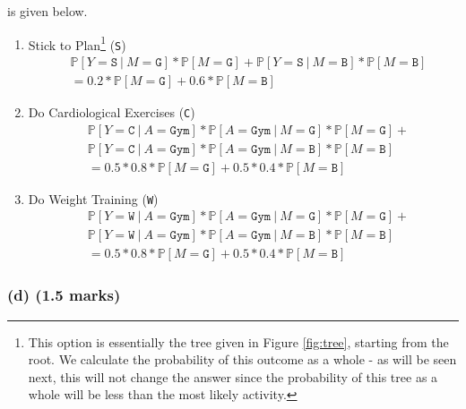 \documentclass[12pt]{article}
\begin{document}
    is given below.
    \begin{enumerate}
        \item Stick to Plan\footnote{
            This option is essentially the tree given in Figure \ref{fig:tree}, starting
            from the root. We calculate the probability of this outcome as a whole - as will
            be seen next, this will not change the answer since the probability of this tree
            as a whole will be less than the most likely activity.
        } (\texttt{S}) \begin{align*}
            &\mathbb{P}[Y = \texttt{S} \ | \ M = \texttt{G}] * \mathbb{P}[M = \texttt{G}] + \mathbb{P}[Y = \texttt{S} \ | \ M = \texttt{B}] * \mathbb{P}[M = \texttt{B}] \\
            &= 0.2 * \mathbb{P}[M = \texttt{G}] + 0.6 * \mathbb{P}[M = \texttt{B}]
        \end{align*}

        \item Do Cardiological Exercises (\texttt{C}) \begin{align*}
            &\mathbb{P}[Y = \texttt{C} \ | \ A = \texttt{Gym}] * \mathbb{P}[A = \texttt{Gym} \ | \ M = \texttt{G}] * \mathbb{P}[M = \texttt{G}] + \\
            &\mathbb{P}[Y = \texttt{C} \ | \ A = \texttt{Gym}] * \mathbb{P}[A = \texttt{Gym} \ | \ M = \texttt{B}] * \mathbb{P}[M = \texttt{B}] \\
            &= 0.5 * 0.8 * \mathbb{P}[M = \texttt{G}] + 0.5 * 0.4 * \mathbb{P}[M = \texttt{B}]
        \end{align*}

        \item Do Weight Training (\texttt{W}) \begin{align*}
            &\mathbb{P}[Y = \texttt{W} \ | \ A = \texttt{Gym}] * \mathbb{P}[A = \texttt{Gym} \ | \ M = \texttt{G}] * \mathbb{P}[M = \texttt{G}] + \\
            &\mathbb{P}[Y = \texttt{W} \ | \ A = \texttt{Gym}] * \mathbb{P}[A = \texttt{Gym} \ | \ M = \texttt{B}] * \mathbb{P}[M = \texttt{B}] \\
            &= 0.5 * 0.8 * \mathbb{P}[M = \texttt{G}] + 0.5 * 0.4 * \mathbb{P}[M = \texttt{B}]
        \end{align*}
    \end{enumerate}

    \subsubsection*{(d) (1.5 marks)}
\end{document}

